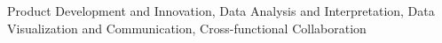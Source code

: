 Product Development and Innovation, Data Analysis and Interpretation, Data Visualization and Communication, Cross-functional Collaboration
